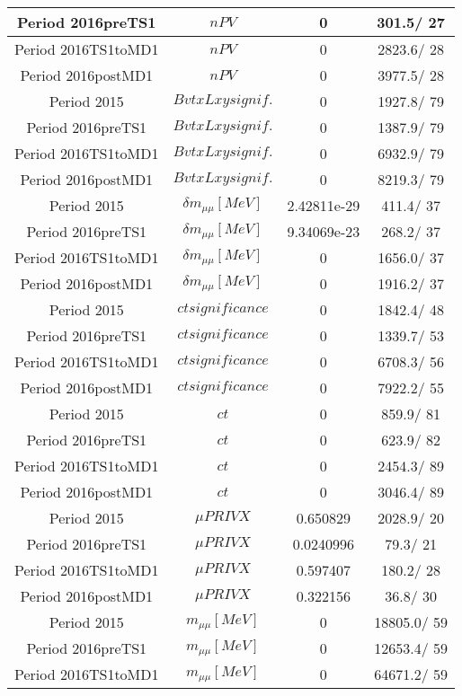 \documentclass{article}
\begin{document}
\begin{longtable}{c|c|c|c}
\hline
 Period 2016preTS1 & $nPV$ & 0 & 301.5/ 27\\
\hline
 Period 2016TS1toMD1 & $nPV$ & 0 & 2823.6/ 28\\
\hline
 Period 2016postMD1 & $nPV$ & 0 & 3977.5/ 28\\
\hline
 Period 2015 & $BvtxLxy signif.$ & 0 & 1927.8/ 79\\
\hline
 Period 2016preTS1 & $BvtxLxy signif.$ & 0 & 1387.9/ 79\\
\hline
 Period 2016TS1toMD1 & $BvtxLxy signif.$ & 0 & 6932.9/ 79\\
\hline
 Period 2016postMD1 & $BvtxLxy signif.$ & 0 & 8219.3/ 79\\
\hline
 Period 2015 & $\delta m_{\mu\mu} [MeV]$ & 2.42811e-29 & 411.4/ 37\\
\hline
 Period 2016preTS1 & $\delta m_{\mu\mu} [MeV]$ & 9.34069e-23 & 268.2/ 37\\
\hline
 Period 2016TS1toMD1 & $\delta m_{\mu\mu} [MeV]$ & 0 & 1656.0/ 37\\
\hline
 Period 2016postMD1 & $\delta m_{\mu\mu} [MeV]$ & 0 & 1916.2/ 37\\
\hline
 Period 2015 & $ct significance$ & 0 & 1842.4/ 48\\
\hline
 Period 2016preTS1 & $ct significance$ & 0 & 1339.7/ 53\\
\hline
 Period 2016TS1toMD1 & $ct significance$ & 0 & 6708.3/ 56\\
\hline
 Period 2016postMD1 & $ct significance$ & 0 & 7922.2/ 55\\
\hline
 Period 2015 & $ct$ & 0 & 859.9/ 81\\
\hline
 Period 2016preTS1 & $ct$ & 0 & 623.9/ 82\\
\hline
 Period 2016TS1toMD1 & $ct$ & 0 & 2454.3/ 89\\
\hline
 Period 2016postMD1 & $ct$ & 0 & 3046.4/ 89\\
\hline
 Period 2015 & $\mu PRIVX$ & 0.650829 & 2028.9/ 20\\
\hline
 Period 2016preTS1 & $\mu PRIVX$ & 0.0240996 &  79.3/ 21\\
\hline
 Period 2016TS1toMD1 & $\mu PRIVX$ & 0.597407 & 180.2/ 28\\
\hline
 Period 2016postMD1 & $\mu PRIVX$ & 0.322156 &  36.8/ 30\\
\hline
 Period 2015 & $m_{\mu\mu} [MeV]$ & 0 & 18805.0/ 59\\
\hline
 Period 2016preTS1 & $m_{\mu\mu} [MeV]$ & 0 & 12653.4/ 59\\
\hline
 Period 2016TS1toMD1 & $m_{\mu\mu} [MeV]$ & 0 & 64671.2/ 59\\

\end{longtable}
\end{document}
